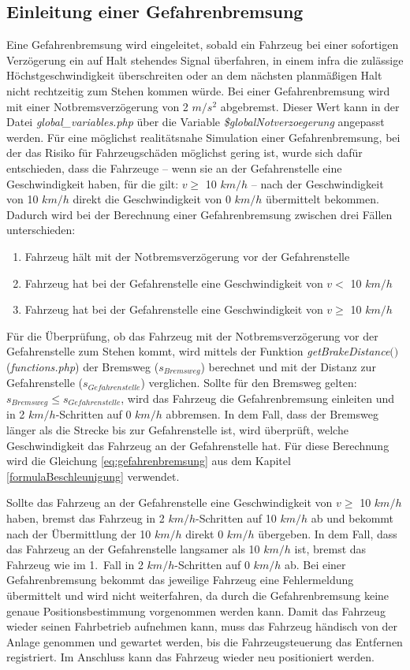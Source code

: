 \subsection{Einleitung einer Gefahrenbremsung} \label{notbremsung}
Eine Gefahrenbremsung wird eingeleitet, sobald ein Fahrzeug bei einer sofortigen Verzögerung ein auf Halt stehendes Signal überfahren, in einem \ac{infra} die zulässige Höchstgeschwindigkeit überschreiten oder an dem nächsten planmäßigen Halt nicht rechtzeitig zum Stehen kommen würde. Bei einer Gefahrenbremsung wird mit einer Notbremsverzögerung von 2 $m/s^2$ abgebremst. Dieser Wert kann in der Datei \textit{global\_variables.php} über die Variable \textit{\$globalNotverzoegerung} angepasst werden. Für eine möglichst realitätsnahe Simulation einer Gefahrenbremsung, bei der das Risiko für Fahrzeugschäden möglichst gering ist, wurde sich dafür entschieden, dass die Fahrzeuge -- wenn sie an der Gefahrenstelle eine Geschwindigkeit haben, für die gilt: $v\geq$ 10 $km/h$ -- nach der Geschwindigkeit von 10 $km/h$ direkt die Geschwindigkeit von 0 $km/h$ übermittelt bekommen. Dadurch wird bei der Berechnung einer Gefahrenbremsung zwischen drei Fällen unterschieden:
\begin{enumerate}
\item Fahrzeug hält mit der Notbremsverzögerung vor der Gefahrenstelle
\item Fahrzeug hat bei der Gefahrenstelle eine Geschwindigkeit von $v<$ 10 $km/h$
\item Fahrzeug hat bei der Gefahrenstelle eine Geschwindigkeit von $v\geq$ 10 $km/h$
\end{enumerate}
Für die Überprüfung, ob das Fahrzeug mit der Notbremsverzögerung vor der Gefahrenstelle zum Stehen kommt, wird mittels der Funktion \textit{getBrakeDistance$($$)$} (\textit{functions.php}) der Bremsweg ($s_{Bremsweg}$) berechnet und mit der Distanz zur Gefahrenstelle ($s_{Gefahrenstelle}$) verglichen. Sollte für den Bremsweg gelten: $s_{Bremsweg}\leq s_{Gefahrenstelle}$, wird das Fahrzeug die Gefahrenbremsung einleiten und in 2 $km/h$-Schritten auf 0 $km/h$ abbremsen. In dem Fall, dass der Bremsweg länger als die Strecke bis zur Gefahrenstelle ist, wird überprüft, welche Geschwindigkeit das Fahrzeug an der Gefahrenstelle hat. Für diese Berechnung wird die Gleichung \ref{eq:gefahrenbremsung} aus dem Kapitel \ref{formulaBeschleunigung} verwendet. 

Sollte das Fahrzeug an der Gefahrenstelle eine Geschwindigkeit von $v\geq$ 10 $km/h$ haben, bremst das Fahrzeug in 2 $km/h$-Schritten auf 10 $km/h$ ab und bekommt nach der Übermittlung der 10 $km/h$ direkt 0 $km/h$ übergeben. In dem Fall, dass das Fahrzeug an der Gefahrenstelle langsamer als 10 $km/h$ ist, bremst das Fahrzeug wie im \mbox{1. Fall} in 2 $km/h$-Schritten auf 0 $km/h$ ab. Bei einer Gefahrenbremsung bekommt das jeweilige Fahrzeug eine Fehlermeldung übermittelt und wird nicht weiterfahren, da durch die Gefahrenbremsung keine genaue Positionsbestimmung vorgenommen werden kann. Damit das Fahrzeug wieder seinen Fahrbetrieb aufnehmen kann, muss das Fahrzeug händisch von der Anlage genommen und gewartet werden, bis die Fahrzeugsteuerung das Entfernen registriert. Im Anschluss kann das Fahrzeug wieder neu positioniert werden.